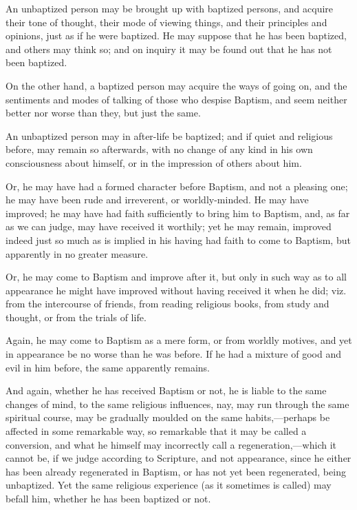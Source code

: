 An unbaptized person may be brought up with baptized persons, and
acquire their tone of thought, their mode of viewing things, and their
principles and opinions, just as if he were baptized. He may suppose
that he has been baptized, and others may think so; and on inquiry it
may be found out that he has not been baptized.

On the other hand, a baptized person may acquire the ways of going
on, and the sentiments and modes of talking of those who despise
Baptism, and seem neither better nor worse than they, but just the
same.

An unbaptized person may in after-life be baptized; and if quiet
and religious before, may remain so afterwards, with no change of any
kind in his own consciousness about himself, or in the impression of
others about him.

Or, he may have had a formed character before Baptism, and not a
pleasing one; he may have been rude and irreverent, or worldly-minded.
He may have improved; he may have had faith sufficiently to bring him
to Baptism, and, as far as we can judge, may have received it
worthily; yet he may remain, improved indeed just so much as is
implied in his having had faith to come to Baptism, but apparently in
no greater measure.

Or, he may come to Baptism and improve after it, but only in such
way as to all appearance he might have improved without having
received it when he did; viz. from the intercourse of friends, from
reading religious books, from study and thought, or from the trials of
life.

Again, he may come to Baptism as a mere form, or from worldly
motives, and yet in appearance be no worse than he was before. If he
had a mixture of good and evil in him before, the same apparently
remains.

And again, whether he has received Baptism or not, he is liable to
the same changes of mind, to the same religious influences, nay, may
run through the same spiritual course, may be gradually moulded on the
same habits,—perhaps be affected in some remarkable way, so
remarkable that it may be called a conversion, and what he himself may
incorrectly call a regeneration,—which it cannot be, if we judge
according to Scripture, and not appearance, since he either has been
already regenerated in Baptism, or has not yet been regenerated, being
unbaptized. Yet the same religious experience (as it sometimes is
called) may befall him, whether he has been baptized or not.

